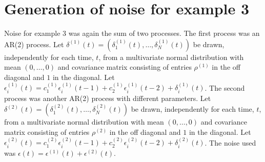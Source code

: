 \documentclass[letterpaper,11pt]{article}
\begin{document}
\section{Generation of noise for example 3}\label{sec:noise3}

Noise for example 3 was again the sum of two processes. 
The first process was an
AR(2) process. Let $\delta^{(1)}(t) = (\delta^{(1)}_1(t),\ldots,\delta^{(1)}_N(t))$ be drawn, independently for each time, $t$, from a multivariate normal distribution with mean $(0,\ldots,0)$
and covariance matrix consisting of entries $\rho^{(1)}$ in the off diagonal and $1$
in the diagonal. Let $\epsilon^{(1)}_i(t)=c_1^{(1)} \epsilon^{(1)}_i(t-1) + c_2^{(1)} \epsilon^{(1)}_i(t-2)+\delta^{(1)}_i(t)$. The second process was
another AR(2) process with different parameters. 
Let $\delta^{(2)}(t) = (\delta^{(2)}_1(t),\ldots,\delta^{(2)}_N(t))$ be drawn, independently for each time, $t$, from a multivariate normal distribution with mean $(0,\ldots,0)$
and covariance matrix consisting of entries $\rho^{(2)}$ in the off diagonal and $1$
in the diagonal. Let $\epsilon^{(2)}_i(t)=c_1^{(2)} \epsilon^{(2)}_i(t-1) + c_2^{(2)} \epsilon^{(2)}_i(t-2)+\delta^{(2)}_i(t)$.
The noise used was $\epsilon(t)=\epsilon^{(1)}(t)+\epsilon^{(2)}(t)$.



\end{document}
